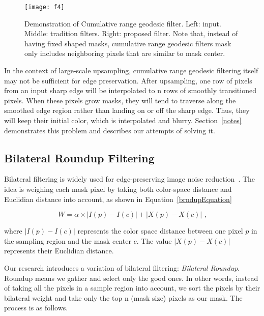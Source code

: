 \begin{figure}[htbp]
\texttt{[image: f4]}
\caption{Demonstration of Cumulative range geodesic filter. Left: input. Middle: tradition filters. Right: proposed filter. Note that, instead of having fixed shaped masks, cumulative range geodesic filter\textquotesingle s mask only includes neighboring pixels that are similar to mask center.}
\label{fig:geodesicExplanation}
\end{figure}



In the context of large-scale upsampling, cumulative range geodesic filtering itself may not be sufficient for edge preservation. After upsampling, one row of pixels from an input sharp edge will be interpolated to n rows of smoothly transitioned pixels. When these pixels grow masks, they will tend to traverse along the smoothed edge region rather than landing on or off the sharp edge. Thus, they will keep their initial color, which is interpolated and blurry. Section~\ref{notes} demonstrates this problem and describes our attempts of solving it.






\subsection{Bilateral Roundup Filtering}\label{Bilateral roundup filtering}
Bilateral filtering is widely used for edge-preserving image noise reduction~\cite{Tomasi:bilateral}. The idea is weighing each mask pixel by taking both color-space distance and Euclidian distance into account, as shown in Equation~\eqref{brndupEquation}

\begin{equation}\label {brndupEquation}
W = \alpha \times |I(p)-I(c)|  + |X(p)-X(c)| \text{ ,}
\end{equation}

where $|I(p)-I(c)|$ represents the color space distance between one pixel $p$ in the sampling region and the mask center $c$. The value $|X(p)-X(c)|$ represents their Euclidian distance. 

Our research introduces a variation of bilateral filtering: \textit{Bilateral Roundup}. Roundup means we gather and select only the good ones. In other words, instead of taking all the pixels in a sample region into account, we sort the pixels by their bilateral weight and take only the top n (mask size) pixels as our mask. The process is as follows.

